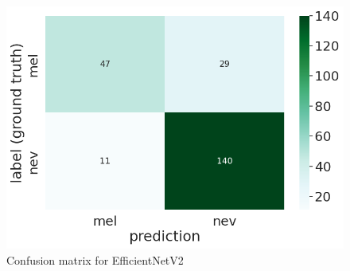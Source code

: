 \documentclass[12pt, a4paper]{article}
\begin{document}
\begin{figure}[h]
    \centering
    \setlength{\fboxsep}{8pt}
    \includegraphics[scale=0.5, fbox]{images/matrix-efficientnet.png}
    \caption{Confusion matrix for EfficientNetV2}
    \label{fig:matrix-efficientnet}
\end{figure}
\end{document}
